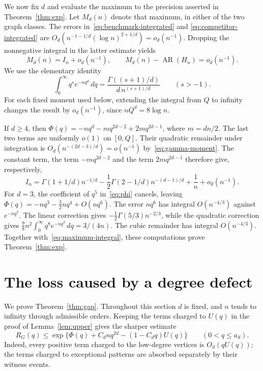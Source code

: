 \documentclass[11pt,reqno]{amsart}
\theoremstyle{remark}
\numberwithin{equation}{section}
\newcommand{\AR}{\operatorname{AR}}
\begin{document}
We now fix $d$ and evaluate the maximum to the precision asserted in
Theorem~\ref{thm:exp}. Let $M_d(n)$ denote that maximum, in either of the
two graph classes. The errors in~\eqref{eq:benchmark-integrated} and
\eqref{eq:competitor-integrated} are
$O_d(n^{-1-1/d}(\log n)^{2+1/d})=o_d(n^{-1})$.
Dropping the nonnegative integral in the latter estimate yields
\begin{equation}\label{eq:maximum-integral}
 M_d(n)=I_n+o_d(n^{-1}),
 \qquad M_d(n)-\AR(H_n)=o_d(n^{-1}).
\end{equation}
We use the elementary identity
\begin{equation}\label{eq:gamma-moment}
 \int_0^\infty q^s e^{-nq^d}\,dq
 =\frac{\Gamma((s+1)/d)}{d\,n^{(s+1)/d}}
 \qquad(s>-1).
\end{equation}
For each fixed moment used below, extending the integral from $Q$ to
infinity changes the result by $o_d(n^{-1})$, since $nQ^d=8\log n$.

If $d\ge4$, then
$\Phi(q)=-nq^d-mq^{2d-2}+2mq^{2d-1}$, where $m=dn/2$.
The last two terms are uniformly $o(1)$ on $[0,Q]$.
Their quadratic remainder under integration is
$O_d(n^{-(2d-3)/d})=o(n^{-1})$ by~\eqref{eq:gamma-moment}.
The constant term, the term $-mq^{2d-2}$ and the term $2mq^{2d-1}$
therefore give, respectively,
\[
 I_n=\Gamma(1+1/d)n^{-1/d}
     -\frac12\Gamma(2-1/d)n^{-(d-1)/d}
     +\frac1n+o_d(n^{-1}).
\]
For $d=3$, the coefficient of $q^5$ in~\eqref{eq:phi} cancels, leaving
$\Phi(q)=-nq^3-\frac32nq^4+O(nq^6)$.
The error $nq^6$ has integral $O(n^{-4/3})$ against $e^{-nq^3}$.
The linear correction gives $-\frac12\Gamma(5/3)n^{-2/3}$, while the
quadratic correction gives
$\frac98n^2\int_0^\infty q^8e^{-nq^3}\,dq=3/(4n)$.
The cubic remainder has integral $O(n^{-4/3})$.
Together with~\eqref{eq:maximum-integral}, these computations prove
Theorem~\ref{thm:exp}.

\section{The loss caused by a degree defect}
\label{sec:defect}

We prove Theorem~\ref{thm:gap}. Throughout this section $d$ is fixed,
and $n$ tends to infinity through admissible orders.
Keeping the terms charged to $U(q)$ in the proof of
Lemma~\ref{lem:upper} gives the sharper estimate
\begin{equation}\label{eq:upper-sharp-defect}
 R_G(q)\le
 \exp\{\Phi(q)+C_dnq^{2d}-(1-C_dq)U(q)\}
 \qquad(0<q\le a_d).
\end{equation}
Indeed, every positive term charged to the low-degree vertices is
$O_d(qU(q))$; the terms charged to exceptional patterns are absorbed
separately by their witness events.
\end{document}
